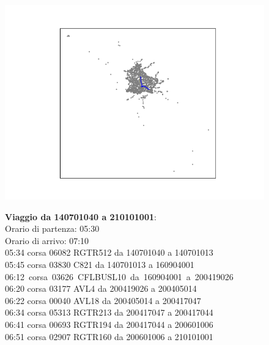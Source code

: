 \documentclass{article}
\begin{document}
\begin{figure}[H]
	\begin{minipage}{0.55\linewidth}
		\centering
		\hspace*{-3cm}\includegraphics[width=1.0\linewidth, valign=t]{figures/140701040_210101001}
	\end{minipage}
	\hspace*{-2cm}\begin{minipage}{0.7\linewidth}
		\textbf{Viaggio da 140701040 a 210101001}:\\
		Orario di partenza: 05:30\\
		Orario di arrivo: 07:10\\
		05:34 corsa 06082 RGTR512 da 140701040 a 140701013\\
		05:45 corsa 03830 C821 da 140701013 a 160904001\\
		\mbox{06:12 corsa 03626 CFLBUSL10 da 160904001 a 200419026}\\
		06:20 corsa 03177 AVL4 da 200419026 a 200405014\\
		06:22 corsa 00040 AVL18 da 200405014 a 200417047\\
		06:34 corsa 05313 RGTR213 da 200417047 a 200417044\\
		06:41 corsa 00693 RGTR194 da 200417044 a 200601006\\
		06:51 corsa 02907 RGTR160 da 200601006 a 210101001
		
			\end{minipage}
\end{figure}
\end{document}
